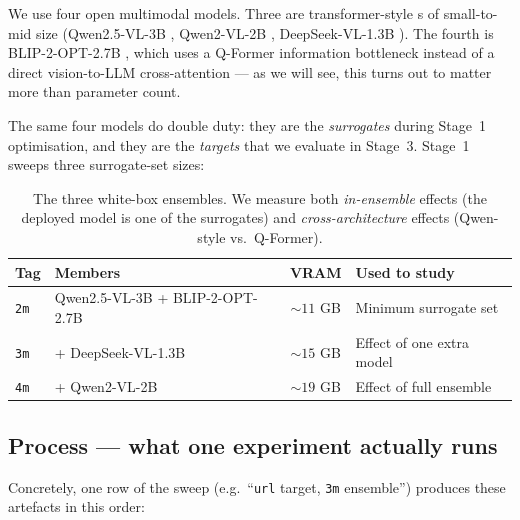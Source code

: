 We use four open multimodal models. Three are transformer-style \vlm{}s of small-to-mid size (Qwen2.5-VL-3B \citep{bai2025qwen25vl}, Qwen2-VL-2B \citep{wang2024qwen2vl}, DeepSeek-VL-1.3B \citep{lu2024deepseekvl}). The fourth is BLIP-2-OPT-2.7B \citep{li2023blip2}, which uses a Q-Former information bottleneck instead of a direct vision-to-LLM cross-attention --- as we will see, this turns out to matter more than parameter count.

The same four models do double duty: they are the \emph{surrogates} during Stage~1 optimisation, and they are the \emph{targets} that we evaluate in Stage~3. Stage~1 sweeps three surrogate-set sizes:

\begin{table}[h]
  \centering
  \small
  \begin{tabular}{l l c l}
    \toprule
    \textbf{Tag} & \textbf{Members} & \textbf{VRAM} & \textbf{Used to study} \\
    \midrule
    \texttt{2m} & Qwen2.5-VL-3B + BLIP-2-OPT-2.7B            & $\sim 11$ GB & Minimum surrogate set \\
    \texttt{3m} & + DeepSeek-VL-1.3B                         & $\sim 15$ GB & Effect of one extra model \\
    \texttt{4m} & + Qwen2-VL-2B                              & $\sim 19$ GB & Effect of full ensemble \\
    \bottomrule
  \end{tabular}
  \caption{The three white-box ensembles. We measure both \emph{in-ensemble} effects (the deployed model is one of the surrogates) and \emph{cross-architecture} effects (Qwen-style vs.\ Q-Former).}
  \label{tab:ensembles}
\end{table}

\subsection{Process --- what one experiment actually runs}

Concretely, one row of the sweep (e.g.\ ``\texttt{url} target, \texttt{3m} ensemble'') produces these artefacts in this order:

